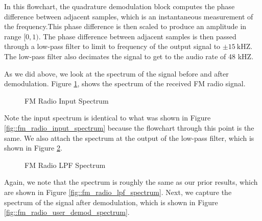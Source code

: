 \documentclass{article}
\begin{document}
\noindent In this flowchart, the quadrature demodulation block computes the phase difference between adjacent samples, which is an instantaneous measurement of the frequency.This phase difference is then scaled to produce an amplitude in range $[0, 1)$. The phase difference between adjacent samples is then passed through a low-pass filter to limit to frequency of the output signal to $\pm 15\ \text{kHZ}$. The low-pass filter also decimates the signal to get to the audio rate of 48 kHZ.

As we did above, we look at the spectrum of the signal before and after demodulation. Figure \ref{fig::fm_radio_user_input_spectrum}, shows the spectrum of the received FM radio signal.
 
\begin{figure}[H]
	\centerline{}
	\caption{FM Radio Input Spectrum}
	\label{fig::fm_radio_user_input_spectrum}
\end{figure}

\noindent Note the input spectrum is identical to what was shown in Figure \ref{fig::fm_radio_input_spectrum} because the flowchart through this point is the same.  We also attach the spectrum at the output of the low-pass filter, which is shown in Figure \ref{fig::fm_radio_user_lpf_spectrum}.

\begin{figure}[H]
	\centerline{}
	\caption{FM Radio LPF Spectrum}
	\label{fig::fm_radio_user_lpf_spectrum}
\end{figure}

\noindent Again, we note that the spectrum is roughly the same as our prior results, which are shown in Figure \ref{fig::fm_radio_lpf_spectrum}. Next, we capture the spectrum of the signal after demodulation, which is shown in Figure \ref{fig::fm_radio_user_demod_spectrum}.
\end{document}
